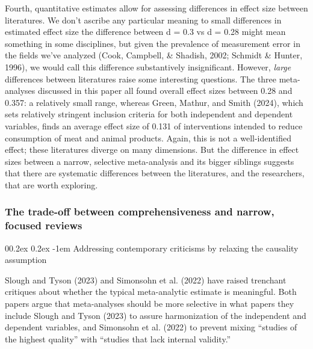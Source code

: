 \documentclass[
  man]{apa6}
\makeatletter
\let\oldparagraph\paragraph
\renewcommand{\paragraph}[1]{\oldparagraph{#1}\mbox{}}
\renewcommand{\paragraph}{\@startsection{paragraph}{4}{\parindent}%
  {0\baselineskip \@plus 0.2ex \@minus 0.2ex}%
  {-1em}%
  {\normalfont\normalsize\bfseries\itshape\typesectitle}}
\makeatother
\begin{document}
Fourth, quantitative estimates allow for assessing differences in effect size between literatures. We don't ascribe any particular meaning to small differences in estimated effect size \textemdash the difference between d = 0.3 vs d = 0.28 might mean something in some disciplines, but given the prevalence of measurement error in the fields we've analyzed (Cook, Campbell, \& Shadish, 2002; Schmidt \& Hunter, 1996), we would call this difference substantively insignificant. However, \emph{large} differences between literatures raise some interesting questions. The three meta-analyses discussed in this paper all found overall effect sizes between 0.28 and 0.357: a relatively small range, whereas Green, Mathur, and Smith (2024), which sets relatively stringent inclusion criteria for both independent and dependent variables, finds an average effect size of 0.131 of interventions intended to reduce consumption of meat and animal products. Again, this is not a well-identified effect; these literatures diverge on many dimensions. But the difference in effect sizes between a narrow, selective meta-analysis and its bigger siblings suggests that there are systematic differences between the literatures, and the researchers, that are worth exploring.

\subsubsection{The trade-off between comprehensiveness and narrow, focused reviews}\label{the-trade-off-between-comprehensiveness-and-narrow-focused-reviews}

\paragraph{Addressing contemporary criticisms by relaxing the causality assumption}\label{addressing-contemporary-criticisms-by-relaxing-the-causality-assumption}

Slough and Tyson (2023) and Simonsohn et al. (2022) have raised trenchant critiques about whether the typical meta-analytic estimate is meaningful. Both papers argue that meta-analyses should be more selective in what papers they include \textemdash Slough and Tyson (2023) to assure harmonization of the independent and dependent variables, and Simonsohn et al. (2022) to prevent mixing ``studies of the highest quality'' with ``studies that lack internal validity.''
\end{document}
